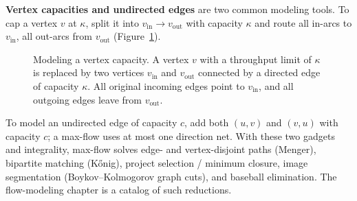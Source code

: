 \begin{applicationbox}
\textbf{Vertex capacities and undirected edges} are two common modeling tools. To cap a vertex $v$ at $\kappa$, split it into
$v_{\text{in}}\to v_{\text{out}}$ with capacity $\kappa$ and route all in-arcs to
$v_{\text{in}}$, all out-arcs from $v_{\text{out}}$ (Figure~\ref{ch12:fig-vertex-split}).
\begin{figure}[H]
\centering
{}
\caption{Modeling a vertex capacity. A vertex $v$ with a throughput limit of $\kappa$ is replaced by two vertices $v_{\text{in}}$ and $v_{\text{out}}$ connected by a directed edge of capacity $\kappa$. All original incoming edges point to $v_{\text{in}}$, and all outgoing edges leave from $v_{\text{out}}$.}
\label{ch12:fig-vertex-split}
\end{figure}
 To model an undirected edge of
capacity $c$, add both $(u,v)$ and $(v,u)$ with capacity $c$; a max-flow uses at
most one direction net. With these two gadgets and integrality, max-flow solves
edge- and vertex-disjoint paths (Menger), bipartite matching (K\H{o}nig), project
selection / minimum closure, image segmentation (Boykov--Kolmogorov graph cuts),
and baseball elimination. The flow-modeling chapter is a catalog of such
reductions.
\end{applicationbox}

